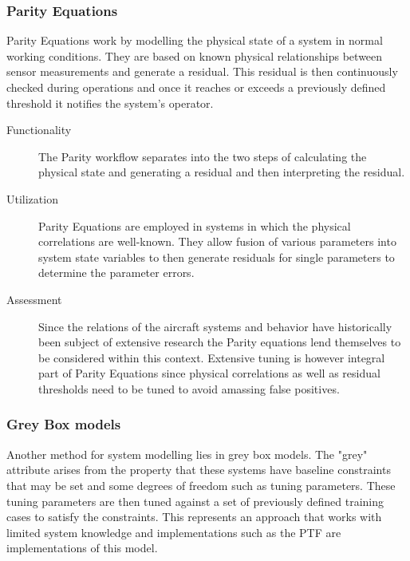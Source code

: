 \subsubsection{Parity Equations}
\label{chap:parity_equation}
Parity Equations work by modelling the physical state of a system in normal working conditions. They are based on known physical relationships between sensor measurements and generate a residual. This residual is then continuously checked during operations and once it reaches or exceeds a previously defined threshold it notifies the system's operator. \cite{isermann_fault-diagnosis_2011}

\begin{description}
    \item[Functionality]\hfill

    The Parity workflow separates into the two steps of calculating the physical state and generating a residual and then interpreting the residual.

    \item[Utilization]\hfill

    Parity Equations are employed in systems in which the physical correlations are well-known. They allow fusion of various parameters into system state variables to then generate residuals for single parameters to determine the parameter errors.

    \item[Assessment]\hfill

    Since the relations of the aircraft systems and behavior have historically been subject of extensive research the Parity equations lend themselves to be considered within this context. Extensive tuning is however integral part of Parity Equations since physical correlations as well as residual thresholds need to be tuned to avoid amassing false positives.
\end{description}

\subsubsection{Grey Box models}

Another method for system modelling lies in grey box models. The "grey" attribute arises from the property that these systems have baseline constraints that may be set and some degrees of freedom such as tuning parameters. These tuning parameters are then tuned against a set of previously defined training cases to satisfy the constraints. This represents an approach that works with limited system knowledge and implementations such as the PTF are implementations of this model. \cite{isermann_fault-diagnosis_2006}

